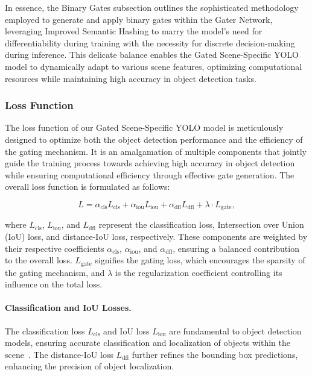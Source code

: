 In essence, the Binary Gates subsection outlines the sophisticated methodology employed to generate and apply binary gates within the Gater Network, leveraging Improved Semantic Hashing to marry the model's need for differentiability during training with the necessity for discrete decision-making during inference. This delicate balance enables the Gated Scene-Specific YOLO model to dynamically adapt to various scene features, optimizing computational resources while maintaining high accuracy in object detection tasks.

\subsubsection{Loss Function}
The loss function of our Gated Scene-Specific YOLO model is meticulously designed to optimize both the object detection performance and the efficiency of the gating mechanism. It is an amalgamation of multiple components that jointly guide the training process towards achieving high accuracy in object detection while ensuring computational efficiency through effective gate generation. The overall loss function is formulated as follows:

\begin{equation}
L = \alpha_{\text{cls}} L_{\text{cls}} + \alpha_{\text{iou}} L_{\text{iou}} + \alpha_{\text{dfl}} L_{\text{dfl}} + \lambda \cdot L_{\text{gate}},
\label{eq:total_loss}
\end{equation}

where \(L_{\text{cls}}\), \(L_{\text{iou}}\), and \(L_{\text{dfl}}\) represent the classification loss, Intersection over Union (IoU) loss, and distance-IoU loss, respectively. These components are weighted by their respective coefficients \(\alpha_{\text{cls}}\), \(\alpha_{\text{iou}}\), and \(\alpha_{\text{dfl}}\), ensuring a balanced contribution to the overall loss. \(L_{\text{gate}}\) signifies the gating loss, which encourages the sparsity of the gating mechanism, and \(\lambda\) is the regularization coefficient controlling its influence on the total loss.

\paragraph{Classification and IoU Losses.} The classification loss \(L_{\text{cls}}\) and IoU loss \(L_{\text{iou}}\) are fundamental to object detection models, ensuring accurate classification and localization of objects within the scene~\cite{li2023yolov6,li2022yolov6}. The distance-IoU loss \(L_{\text{dfl}}\) further refines the bounding box predictions, enhancing the precision of object localization.

